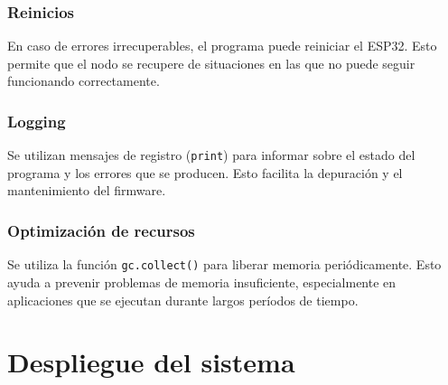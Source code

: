 \subsubsection{Reinicios}

En caso de errores irrecuperables, el programa puede reiniciar el ESP32. Esto
permite que el nodo se recupere de situaciones en las que no puede seguir
funcionando correctamente.

\subsubsection{Logging}

Se utilizan mensajes de registro (\texttt{print}) para informar sobre el estado
del programa y los errores que se producen. Esto facilita la depuración y el
mantenimiento del firmware.

\subsubsection{Optimización de recursos}

Se utiliza la función \texttt{gc.collect()} para liberar memoria
periódicamente. Esto ayuda a prevenir problemas de memoria insuficiente,
especialmente en aplicaciones que se ejecutan durante largos períodos de
tiempo.

\section{Despliegue del sistema}

